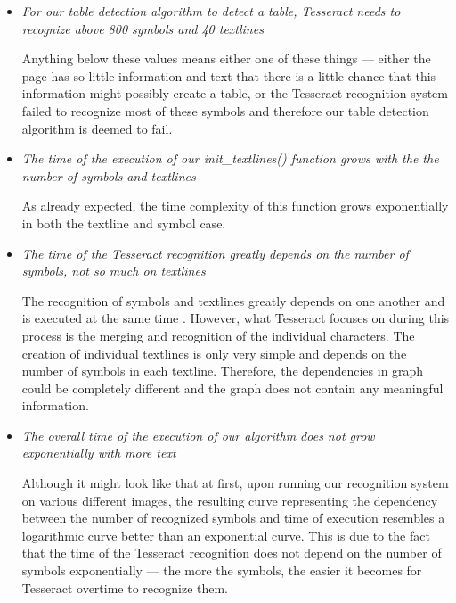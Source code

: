 \begin{itemize}
    \item \emph{For our table detection algorithm to detect a table, Tesseract needs to recognize above 800 symbols and 40 textlines}
    
    Anything below these values means either one of these things --- either the page has so little information and text that there is a little chance that this information might possibly create a table, or the Tesseract recognition system failed to recognize most of these symbols and therefore our table detection algorithm is deemed to fail.

    \item \emph{The time of the execution of our init\_textlines() function grows with the the number of symbols and textlines}
    
    As already expected, the time complexity of this function grows exponentially in both the textline and symbol case.

    \item \emph{The time of the Tesseract recognition greatly depends on the number of symbols, not so much on textlines}
    
    The recognition of symbols and textlines greatly depends on one another and is executed at the same time . However, what Tesseract focuses on during this process is the merging and recognition of the individual characters. The creation of individual textlines is only very simple and depends on the number of symbols in each textline. Therefore, the dependencies in graph  could be completely different and the graph does not contain any meaningful information. 
    
    \item \emph{The overall time of the execution of our algorithm does not grow exponentially with more text}
    
    Although it might look like that at first, upon running our recognition system on various different images, the resulting curve representing the dependency between the number of recognized symbols and time of execution resembles a logarithmic curve better than an exponential curve. This is due to the fact that the time of the Tesseract recognition does not depend on the number of symbols exponentially --- the more the symbols, the easier it becomes for Tesseract overtime to recognize them.
    
\end{itemize}

